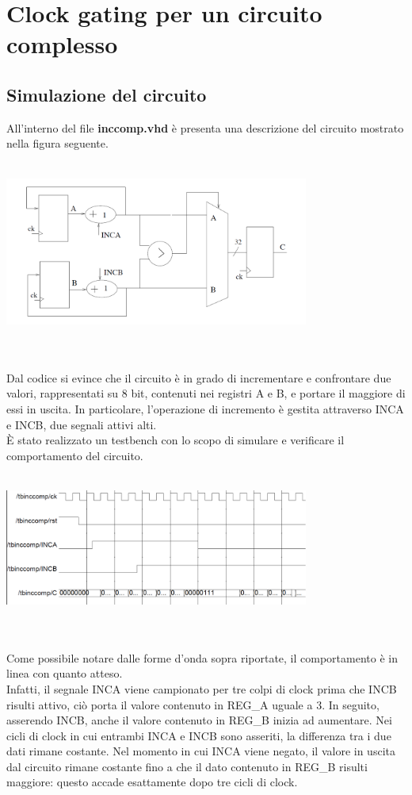 \documentclass[11pt,  english, makeidx, a4paper, titlepage, oneside]{book}
\begin{document}
\section{Clock gating per un circuito complesso}
\subsection{Simulazione del circuito}
All'interno del file \textbf{inccomp.vhd} è presenta una descrizione del circuito mostrato nella figura seguente.
\\\\
\centerline{\includegraphics[width=10cm]{./img/Lab_3/inccomp_no_gating.png}}
\\\\
Dal codice si evince che il circuito è in grado di incrementare e confrontare due valori, rappresentati su 8 bit, contenuti nei registri A e B, e portare il maggiore di essi in uscita. In particolare, l'operazione di incremento è gestita attraverso INCA e INCB, due segnali attivi alti.
\\
È stato realizzato un testbench con lo scopo di simulare e verificare il comportamento del circuito.
\\\\
\centerline{\includegraphics[width=10cm]{./img/Lab_3/inccomp_no_gating_behavior.png}}
\\\\
Come possibile notare dalle forme d'onda sopra riportate, il comportamento è in linea con quanto atteso.
\\ 
Infatti, il segnale INCA viene campionato per tre colpi di clock prima che INCB risulti attivo, ciò porta il valore contenuto in REG\_A uguale a 3. In seguito, asserendo INCB, anche il valore contenuto in REG\_B inizia ad aumentare. Nei cicli di clock in cui entrambi INCA e INCB sono asseriti, la differenza tra i due dati rimane costante. Nel momento in cui INCA viene negato, il valore in uscita dal circuito rimane costante fino a che il dato contenuto in REG\_B risulti maggiore: questo accade esattamente dopo tre cicli di clock.
\end{document}
